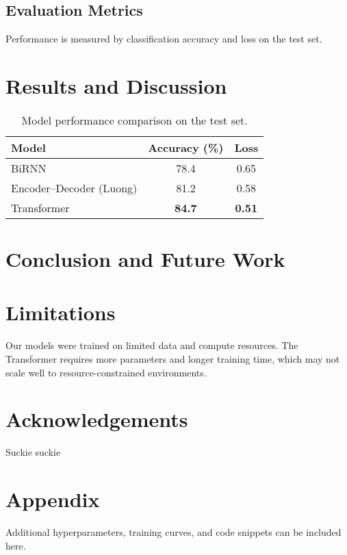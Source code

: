 \documentclass[11pt]{article}
\begin{document}
\subsection{Evaluation Metrics}
Performance is measured by classification accuracy and loss on the test set. 

\section{Results and Discussion}
\begin{table}[h]
\centering
\begin{tabular}{lcc}
\hline
\textbf{Model} & \textbf{Accuracy (\%)} & \textbf{Loss} \\
\hline
BiRNN & 78.4 & 0.65 \\
Encoder–Decoder (Luong) & 81.2 & 0.58 \\
Transformer & \textbf{84.7} & \textbf{0.51} \\
\hline
\end{tabular}
\caption{Model performance comparison on the test set.}
\label{tab:results}
\end{table}



\section{Conclusion and Future Work}


\section*{Limitations}
Our models were trained on limited data and compute resources. The Transformer requires more parameters and longer training time, which may not scale well to resource-constrained environments.

\section*{Acknowledgements}
Suckie suckie



\appendix
\section{Appendix}
Additional hyperparameters, training curves, and code snippets can be included here.
\end{document}
